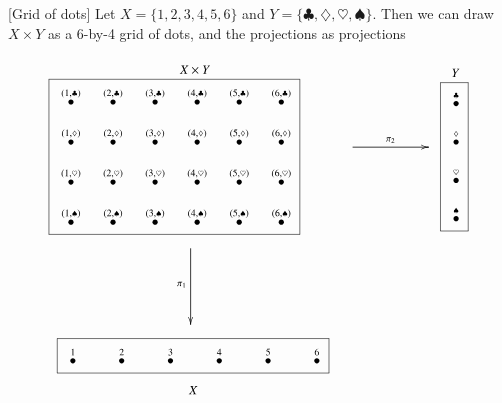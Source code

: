 \documentclass[a4paper]{book}
\newcommand{\LMO}[1]{\stackrel{#1}{\bullet}}
\theoremstyle{myth}
\newtheorem{exampleENG}[envENG]{\begin{english}Example\end{english}}
\begin{document}
\begin{russian}
\begin{exampleENG}\label{ex:grid1}[Grid of dots]
Let $X=\{1,2,3,4,5,6\}$ and $Y=\{\clubsuit,\diamondsuit,\heartsuit,\spadesuit\}$. Then we can draw $X\times Y$ as a 6-by-4 grid of dots, and the projections as projections
\begin{align}
\parbox{2.9in}{\begin{center}\small $X\times Y$\vspace{-.1in}\end{center}\fbox{
\xymatrix@=10pt{
\LMO{(1,\clubsuit)}&\LMO{(2,\clubsuit)}&\LMO{(3,\clubsuit)}&\LMO{(4,\clubsuit)}&\LMO{(5,\clubsuit)}&\LMO{(6,\clubsuit)}\\
\LMO{(1,\diamondsuit)}&\LMO{(2,\diamondsuit)}&\LMO{(3,\diamondsuit)}&\LMO{(4,\diamondsuit)}&\LMO{(5,\diamondsuit)}&\LMO{(6,\diamondsuit)}\\
\LMO{(1,\heartsuit)}&\LMO{(2,\heartsuit)}&\LMO{(3,\heartsuit)}&\LMO{(4,\heartsuit)}&\LMO{(5,\heartsuit)}&\LMO{(6,\heartsuit)}\\
\LMO{(1,\spadesuit)}&\LMO{(2,\spadesuit)}&\LMO{(3,\spadesuit)}&\LMO{(4,\spadesuit)}&\LMO{(5,\spadesuit)}&\LMO{(6,\spadesuit)}\\
}}}
\parbox{.9in}{
\xymatrix{~\ar[rr]^{\pi_2}&&~}
}
\parbox{.3in}{\begin{center}\small $Y$\vspace{-.1in}\end{center}\fbox{
\xymatrix@=10pt{
\LMO{\clubsuit}\\\LMO{\diamondsuit}\\\LMO{\heartsuit}\\\LMO{\spadesuit}
}}}
\\\nonumber
\parbox{1in}{\hspace{-1.95in}\xymatrix{~\ar[dd]_{\pi_1}\\\\~}}
\\\nonumber
\parbox{2.9in}{\hspace{-1.2in}\fbox{
\xymatrix@=24pt{
\LMO{1}&\LMO{2}&\LMO{3}&\LMO{4}&\LMO{5}&\LMO{6}
}}\begin{center}\hspace{-2.6in}\small$X$\end{center}}
\end{align}
\end{exampleENG}


\end{russian}
\end{document}
